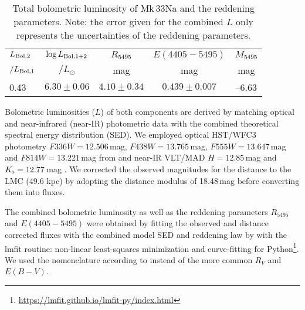 \documentclass[fleqn,usenatbib]{mnras}
\begin{document}
\begin{table}
	\centering
	\caption{Total bolometric luminosity of Mk\,33Na and the reddening parameters. Note: the error given for the combined $L$ only represents the uncertainties of the reddening parameters.
}
	\label{t:lum_red}
	\begin{tabular}{lcccc}
		\hline
		$L_{\rm Bol,2}$	&$\log L_{\rm Bol,1+2}$& $R_{5495}$ &  $E(4405-5495)$ & $M_{5495}$ \\%
		$/L_{\rm Bol,1}$          & $/L_{\odot}$                  & mag             & mag                     & mag \\
		\hline
		0.43		&$6.30\pm0.06$		& $4.10\pm0.34$	& $0.439\pm0.007$	& --6.63	\\
		\hline
	\end{tabular}
\end{table}


Bolometric luminosities ($L$) of both components are derived by matching optical and near-infrared (near-IR) photometric data with the combined theoretical spectral energy distribution (SED). We employed optical HST/WFC3 photometry $F336W = 12.506$\,mag, $F438W = 13.765$\,mag, $F555W = 13.647$\,mag and $F814W = 13.221$\,mag from \cite{deMarchi2011} and near-IR VLT/MAD $H = 12.85$\,mag and $K_{\rm s} = 12.77$\,mag \citep{campbell2010}. We corrected the observed magnitudes for the distance to the LMC (49.6 kpc) by adopting the distance modulus of 18.48\,mag \citep{pietrzynski2019} before converting them into fluxes.

The combined bolometric luminosity as well as the reddening parameters $R_{5495}$ and $E(4405-5495)$ were obtained by fitting the observed and distance corrected fluxes with the combined model SED and reddening law by \cite{ma-ap2014} with the {\sc lmfit} routine: non-linear least-squares minimization and curve-fitting for Python\footnote{\url{https://lmfit.github.io/lmfit-py/index.html}}. We used the nomenclature according to \cite{ma-ap2014} instead of the more common $R_{V}$ and $E(B-V)$.
\end{document}
